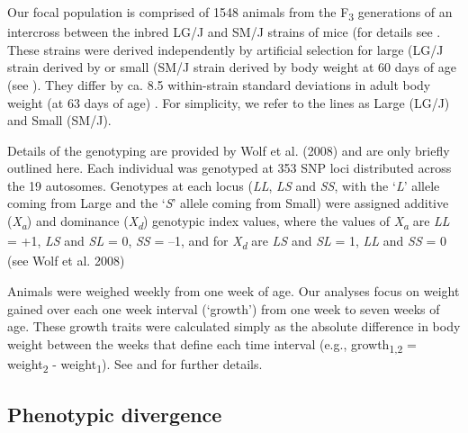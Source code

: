 \begin{refsection}
Our focal population is comprised of 1548 animals from the
F\textsubscript{3} generations of an intercross between the inbred LG/J
and SM/J strains of mice (for details see \textcite{Cheverud1996-fm,Wolf2008-cq}.
These strains were derived independently by
artificial selection for large (LG/J strain derived by \textcite{Goodale1938-an} or small
(SM/J strain derived by \textcite{MacArthur1944-ew} body weight
at 60 days of age (see  \textcite{Chai1956-fy}).
They differ by ca. 8.5 within-strain standard deviations in
adult body weight (at 63 days of age) \parencite{Kramer1998-cc}. For
simplicity, we refer to the lines as Large (LG/J) and Small (SM/J).

Details of the genotyping are provided by Wolf et al. (2008) and are
only briefly outlined here. Each individual was genotyped at 353 SNP
loci distributed across the 19 autosomes. Genotypes at each locus
(\emph{LL}, \emph{LS} and \emph{SS}, with the `\emph{L}' allele coming
from Large and the `\emph{S}' allele coming from Small) were assigned
additive (\emph{X\textsubscript{a}}) and dominance
(\emph{X\textsubscript{d}}) genotypic index values, where the values of
\emph{X\textsubscript{a}} are \emph{LL} = +1, \emph{LS} and \emph{SL} =
0, \emph{SS} = --1, and for \emph{X\textsubscript{d}} are \emph{LS} and
\emph{SL} = 1, \emph{LL} and \emph{SS} = 0 (see Wolf et al. 2008)

Animals were weighed weekly from one week of age. Our analyses focus on
weight gained over each one week interval (`growth') from one week to
seven weeks of age. These growth traits were calculated simply as the
absolute difference in body weight between the weeks that define each
time interval (e.g., growth\textsubscript{1,2} = weight\textsubscript{2}
- weight\textsubscript{1}). See \textcite{Vaughn1999-wt} and \textcite{Hager2009-mz}
 for further details.

\subsection{Phenotypic divergence}


\end{refsection}
